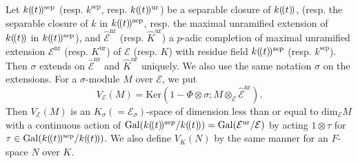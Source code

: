 \documentclass[11pt]{amsart}
\begin{document}
\vspace*{3mm}

Let $k(\hspace*{-0.5mm}(t)\hspace*{-0.5mm})^{\mathrm{sep}}$ 
(resp. $k^{\mathrm{sep}}$, resp. $k(\hspace*{-0.5mm}(t)\hspace*{-0.5mm})^{\mathrm{ur}}$) 
be a separable closure of $k(\hspace*{-0.5mm}(t)\hspace*{-0.5mm})$, 
(resp. the separable closure of $k$ in $k(\hspace*{-0.5mm}(t)\hspace*{-0.5mm})^{\mathrm{sep}}$, 
resp. the maximal 
unramified extension of $k(\hspace*{-0.5mm}(t)\hspace*{-0.5mm})$ in $k(\hspace*{-0.5mm}(t)\hspace*{-0.5mm})^{\mathrm{sep}}$), 
and $\widehat{\mathcal E}^{\mathrm{nr}}$ (resp. $\widehat{K}^{\mathrm{ur}}$) a $p$-adic completion 
of maximal unramified extension $\mathcal E^{\mathrm{nr}}$ (resp. $K^{\mathrm{ur}}$) 
of $\mathcal E$ (resp. $K$) with residue field $k(\hspace*{-0.5mm}(t)\hspace*{-0.5mm})^{\mathrm{sep}}$ 
(resp. $k^{\mathrm{sep}}$). 
Then $\sigma$ extends on $\widehat{\mathcal E}^{\mathrm{nr}}$ and $\widehat{K}^{\mathrm{ur}}$ uniquely. 
We also use the same notation $\sigma$ on the extensions.
For a $\sigma$-module $M$ over $\mathcal E$, we put 
$$
     V_{\mathcal E}(M) = \mathrm{Ker}(1 -\Phi\otimes\sigma; M \otimes_{\mathcal E} \widehat{\mathcal E}^{\mathrm{nr}}). 
$$
Then $V_{\mathcal E}(M)$ is an $K_\sigma (= \mathcal E_\sigma)$-space 
of dimension less than or equal to $\mathrm{dim}_{\mathcal E}M$ with 
a continuous action of 
$\mathrm{Gal}(k(\hspace*{-0.5mm}(t)\hspace*{-0.5mm})^{\mathrm{sep}}/k(\hspace*{-0.5mm}(t)\hspace*{-0.5mm})) 
= \mathrm{Gal}(\mathcal E^{\mathrm{ur}}/\mathcal E)$ 
by acting $1 \otimes \tau$ for $\tau \in 
\mathrm{Gal}(k(\hspace*{-0.5mm}(t)\hspace*{-0.5mm})^{\mathrm{sep}}/k(\hspace*{-0.5mm}(t)\hspace*{-0.5mm}))$. 
We also define $V_K(N)$ by the same manner for an $F$-space $N$ over $K$. 
\end{document}
